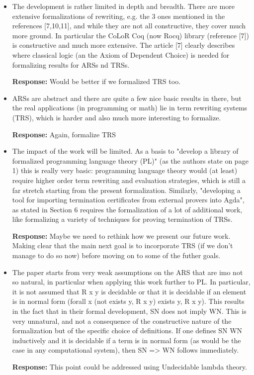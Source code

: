 \documentclass[11pt]{article}
\newcommand{\res}[1]{\par\noindent\textbf{Response:} #1\par}
\begin{document}
\begin{itemize}
	\item The development is rather limited in depth and breadth. There are more extensive formalizations of rewriting, e.g. the 3 ones mentioned in the references [7,10,11], and while they are not all constructive, they cover much more ground. In particular the CoLoR Coq (now Rocq) library (reference [7]) is constructive and much more extensive. The article [7] clearly describes where classical logic (an the Axiom of Dependent Choice) is needed for formalizing results for ARSs nd TRSs.
	      \res{Would be better if we formalized TRS too. }
	\item ARSs are abstract and there are quite a few nice basic results in there, but the real applications (in programming or math) lie in term rewriting systems (TRS), which is harder and also much more interesting to formalize.
	      \res{Again, formalize TRS}
	\item The impact of the work will be limited. As a basis to "develop a  library of formalized programming language theory (PL)" (as the authors state on page 1) this is really very basic: programming language theory would (at least) require higher order term rewriting and evaluation strategies, which is still a far stretch starting from the present formalization. Similarly, "developing a tool for importing termination certificates from external provers into Agda", as stated in Section 6 requires the formalization of a lot of additional work, like formalizing a variety of techniques for proving termination of TRSs.
	      \res{Maybe we need to rethink how we present our future work. Making clear that the main next goal is to incorporate TRS (if we don't manage to do so now) before moving on to some of the futher goals.}
	\item The paper starts from very weak assumptions on the ARS that are imo not so natural, in particular when applying this work further to PL. In particular, it is not assumed that R x y is decidable or that it is decidable if an element is in normal form (forall x (not exists y, R x y) \/ exists y, R x y).  This results in the fact that in their formal development, SN does not imply WN. This is very unnatural, and not a consequence of the constructive nature of the formalization but of the specific choice of definitions. If one defines SN WN inductively and it is decidable if a term is in normal form (as would be the case in any computational system), then SN => WN follows immediately.
	      \res{This point could be addressed using Undecidable lambda theory. }

\end{itemize}
\end{document}

